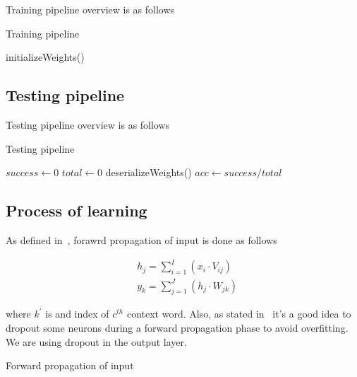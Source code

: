 \documentclass{article}
\newcommand{\SetAlgoStyle}{
	\SetAlgoNoLine
	\SetAlgoNoEnd
	\DontPrintSemicolon
}
\begin{document}
Training pipeline overview is as follows

\begin{algorithm}[H]
	\caption{Training pipeline}
	\SetAlgoStyle
	initializeWeights()\;
\end{algorithm}

\subsection{Testing pipeline}

Testing pipeline overview is as follows

\begin{algorithm}[H]
	\caption{Testing pipeline}
	\SetAlgoStyle
	$success \gets 0$\;
	$total \gets 0$\;
	deserializeWeights()\;
	$acc \gets success / total$\;
\end{algorithm}

\subsection{Process of learning}

As defined in~\cite{1411.2738}, forawrd propagation of input is done as follows

\begin{align}
	&h_j = \sum_{i=1}^I (x_i \cdot V_{ij}) \\
	&y_k = \sum_{j=1}^J (h_j \cdot W_{jk})
\end{align}

where $k^\prime$ is and index of $c^{th}$ context word. Also, as stated
in~\cite{1512.05287} it's a good idea to dropout some neurons during a forward
propagation phase to avoid overfitting. We are using dropout in the output layer.

\begin{algorithm}[H]
	\caption{Forward propagation of input}
	\SetAlgoStyle
\end{algorithm}
\end{document}
